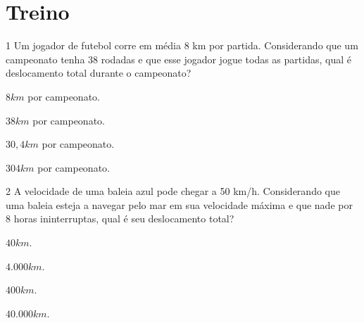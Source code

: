{{{




\section*{Treino}

\num{1} Um jogador de futebol corre em média 8 km por partida. Considerando
que um campeonato tenha 38 rodadas e que esse jogador jogue todas as
partidas, qual é deslocamento total durante o campeonato?

\begin{escolha}[itemsep=0pt]
\item $8 km$ por campeonato.
\item $38 km$ por campeonato.
\item $30,4 km$ por campeonato.
\item $304 km$ por campeonato.
\end{escolha}







\num{2} A velocidade de uma baleia azul pode chegar a 50 km/h. Considerando
que uma baleia esteja a navegar pelo mar em sua velocidade máxima e que
nade por 8 horas ininterruptas, qual é seu deslocamento total?

\begin{escolha}[itemsep=0pt]
\item $40 km$.
\item $4.000 km$.
\item $400 km$.
\item $40.000 km$.
\end{escolha}

}}}
